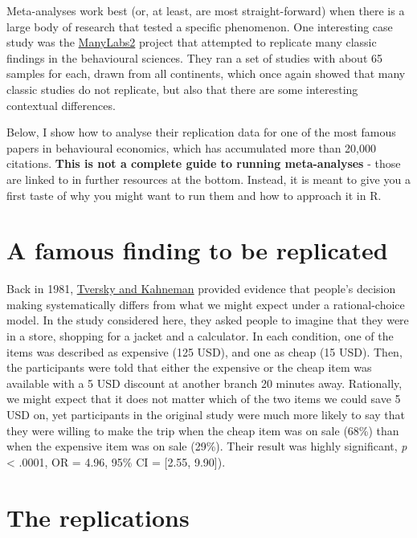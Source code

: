 \documentclass[
]{book}
\begin{document}
Meta-analyses work best (or, at least, are most straight-forward) when there is a large body of research that tested a specific phenomenon. One interesting case study was the \href{https://journals-sagepub-com.gold.idm.oclc.org/doi/pdf/10.1177/2515245918810225}{ManyLabs2} project that attempted to replicate many classic findings in the behavioural sciences. They ran a set of studies with about 65 samples for each, drawn from all continents, which once again showed that many classic studies do not replicate, but also that there are some interesting contextual differences.

Below, I show how to analyse their replication data for one of the most famous papers in behavioural economics, which has accumulated more than 20,000 citations. \textbf{This is not a complete guide to running meta-analyses} - those are linked to in further resources at the bottom. Instead, it is meant to give you a first taste of why you might want to run them and how to approach it in R.

\hypertarget{a-famous-finding-to-be-replicated}{%
\section{A famous finding to be replicated}\label{a-famous-finding-to-be-replicated}}

Back in 1981, \href{https://science.sciencemag.org/content/sci/211/4481/453.full.pdf?casa_token=jLVtwVMB_-4AAAAA:Q433DznZmNyEY-UFd9syhJ1imhxSPYYNoqVcNp31Fxi2hS49xP62auJu4_CIZ3gb3dda80YQ6KviU2c}{Tversky and Kahneman} provided evidence that people's decision making systematically differs from what we might expect under a rational-choice model. In the study considered here, they asked people to imagine that they were in a store, shopping for a jacket and a calculator. In each condition, one of the items was described as expensive (125 USD), and one as cheap (15 USD). Then, the participants were told that either the expensive or the cheap item was available with a 5 USD discount at another branch 20 minutes away. Rationally, we might expect that it does not matter which of the two items we could save 5 USD on, yet participants in the original study were much more likely to say that they were willing to make the trip when the cheap item was on sale (68\%) than when the expensive item was on sale (29\%). Their result was highly significant, \emph{p} \textless{} .0001, OR = 4.96, 95\% CI = {[}2.55, 9.90{]}).

\hypertarget{the-replications}{%
\section{The replications}\label{the-replications}}
\end{document}
